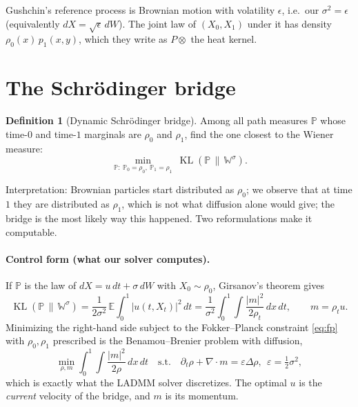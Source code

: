 \documentclass[11pt]{article}
\newcommand{\eps}{\varepsilon}
\newcommand{\E}{\mathbb{E}}
\newcommand{\dv}{\nabla\cdot}
\newcommand{\KL}{\operatorname{KL}}
\theoremstyle{definition}
\newtheorem{definition}{Definition}[section]
\theoremstyle{plain}
\begin{document}
\begin{readbox}
Gushchin's reference process is Brownian motion with volatility $\epsilon$, i.e.\ our
$\sigma^2=\epsilon$ (equivalently $dX=\sqrt\epsilon\,dW$). The joint law of $(X_0,X_1)$
under it has density $\rho_0(x)\,p_1(x,y)$, which they write as $P\otimes$ the heat kernel.
\end{readbox}

\section{The Schr\"odinger bridge}
\label{sec:sb}

\begin{definition}[Dynamic Schr\"odinger bridge]
Among all path measures $\mathbb{P}$ whose time-$0$ and time-$1$ marginals are $\rho_0$ and
$\rho_1$, find the one closest to the Wiener measure:
\[
  \min_{\mathbb{P}:\ \mathbb{P}_0=\rho_0,\ \mathbb{P}_1=\rho_1}\ \KL(\mathbb{P}\,\|\,\mathbb{W}^\sigma).
\]
\end{definition}
Interpretation: Brownian particles start distributed as $\rho_0$; we observe that at time
$1$ they are distributed as $\rho_1$, which is not what diffusion alone would give; the
bridge is the most likely way this happened. Two reformulations make it computable.

\paragraph{Control form (what our solver computes).}
If $\mathbb{P}$ is the law of $dX=u\,dt+\sigma\,dW$ with $X_0\sim\rho_0$, Girsanov's theorem gives
\begin{equation}
  \label{eq:girsanov}
  \KL(\mathbb{P}\,\|\,\mathbb{W}^\sigma)=\frac{1}{2\sigma^2}\,\E\int_0^1|u(t,X_t)|^2\,dt
  =\frac{1}{\sigma^2}\int_0^1\!\!\int\frac{|m|^2}{2\rho_t}\,dx\,dt,\qquad m=\rho_tu .
\end{equation}
Minimizing the right-hand side subject to the Fokker--Planck constraint \eqref{eq:fp} with
$\rho_0,\rho_1$ prescribed is the Benamou--Brenier problem with diffusion,
\begin{equation}
  \label{eq:bb}
  \min_{\rho,m}\int_0^1\!\!\int\frac{|m|^2}{2\rho}\,dx\,dt\quad\text{s.t.}\quad
  \partial_t\rho+\dv m=\eps\Delta\rho,\ \ \eps=\tfrac12\sigma^2,
\end{equation}
which is exactly what the LADMM solver discretizes. The optimal $u$ is the \emph{current}
velocity of the bridge, and $m$ is its momentum.
\end{document}
